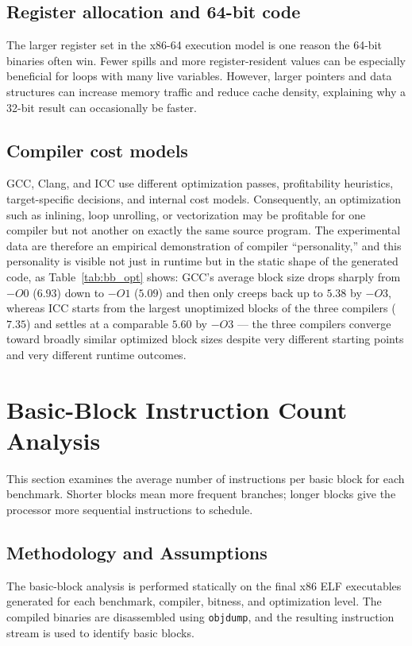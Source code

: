 \documentclass[11pt,a4paper]{article}
\begin{document}
\subsection{Register allocation and 64-bit code}
The larger register set in the x86-64 execution model is one reason the 64-bit binaries often win. Fewer spills and more register-resident values can be especially beneficial for loops with many live variables. However, larger pointers and data structures can increase memory traffic and reduce cache density, explaining why a 32-bit result can occasionally be faster.

\subsection{Compiler cost models}
GCC, Clang, and ICC use different optimization passes, profitability heuristics, target-specific decisions, and internal cost models. Consequently, an optimization such as inlining, loop unrolling, or vectorization may be profitable for one compiler but not another on exactly the same source program. The experimental data are therefore an empirical demonstration of compiler ``personality,'' and this personality is visible not just in runtime but in the static shape of the generated code, as Table~\ref{tab:bb_opt} shows: GCC's average block size drops sharply from $-O0$ ($6.93$) down to $-O1$ ($5.09$) and then only creeps back up to $5.38$ by $-O3$, whereas ICC starts from the largest unoptimized blocks of the three compilers ($7.35$) and settles at a comparable $5.60$ by $-O3$ --- the three compilers converge toward broadly similar optimized block sizes despite very different starting points and very different runtime outcomes.

\section{Basic-Block Instruction Count Analysis}
\label{sec:bb}
 
This section examines the average number of instructions per basic block for each benchmark. Shorter blocks mean more frequent branches; longer blocks give the processor more sequential instructions to schedule.
 
\subsection{Methodology and Assumptions}
\label{sec:bb_methodology}

The basic-block analysis is performed statically on the final x86 ELF
executables generated for each benchmark, compiler, bitness, and
optimization level. The compiled binaries are disassembled using
\texttt{objdump}, and the resulting instruction stream is used to identify
basic blocks.
\end{document}

